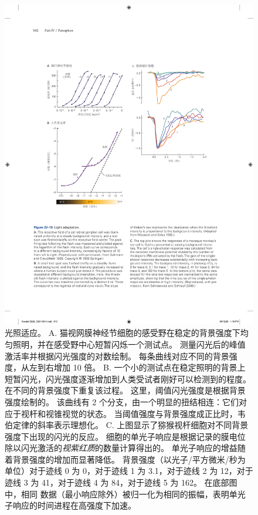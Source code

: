 \begin{figure}[htbp]
	\centering
	\includegraphics[width=1.0\linewidth]{chap22/fig_22_19}
	\caption{光照适应。 
		A. 猫视网膜神经节细胞的感受野在稳定的背景强度下均匀照明，并在感受野中心短暂闪烁一个测试点。 
		测量闪光后的峰值激活率并根据闪光强度的对数绘制。
		每条曲线对应不同的背景强度，从左到右增加 10 倍\cite{sakmann1969scotopic}。
		B. 一个小的测试点在稳定照明的背景上短暂闪光，闪光强度逐渐增加到人类受试者刚好可以检测到的程度。
		在不同的背景强度下重复该过程。
		这里，阈值闪光强度是根据背景强度绘制的。
		该曲线有 2 个分支，由一个明显的扭结相连：它们对应于视杆和视锥视觉的状态。
		当阈值强度与背景强度成正比时，韦伯定律的斜率表示理想化\cite{wyszecki2000color}。
		C. 上图显示了猕猴视杆细胞对不同背景强度下出现的闪光的反应。 
		细胞的单光子响应是根据记录的膜电位除以闪光激活的\textit{视紫红质}的数量计算得出的。 
		单光子响应的增益随着背景强度的增加而显著降低。
		背景强度（以光子/平方微米/秒为单位）对于迹线 0 为 0，对于迹线 1 为 3.1，对于迹线 2 为 12，对于迹线 3 为 41，对于迹线 4 为 84，对于迹线 5 为 162。
		在底部图中，相同 数据（最小响应除外）被归一化为相同的振幅，表明单光子响应的时间进程在高强度下加速\cite{schneeweis2000noise}。}
	\label{fig:22_19}
\end{figure}


